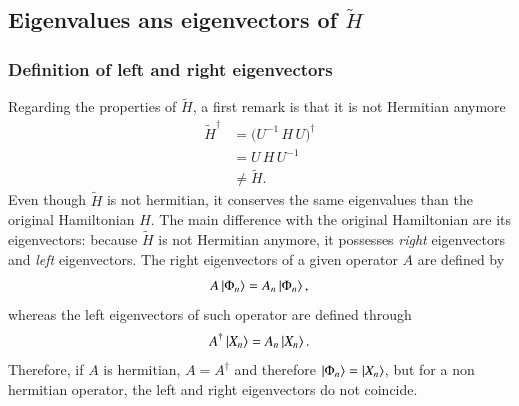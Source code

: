 \documentclass[aip,jcp,reprint,noshowkeys,superscriptaddress]{revtex4-1}
\begin{document}
\subsection{Eigenvalues ans eigenvectors of $\tilde{H}$}
\subsubsection{Definition of left and right eigenvectors}
Regarding the properties of $\tilde{H}$, a first remark is that it is not Hermitian anymore
\begin{equation}
 \begin{aligned}
 \tilde{H}^\dagger & = \bigg(  U^{-1} \, H \,U \bigg)^\dagger \\
                   & = U\, H \, U^{-1}  \\
                   & \ne \tilde{H}.
 \end{aligned}
\end{equation}
Even though $\tilde{H}$ is not hermitian, it conserves the same eigenvalues than the original Hamiltonian $H$. 
The main difference with the original Hamiltonian are its eigenvectors: because $\tilde{H}$ is not Hermitian anymore, it possesses \textit{right} eigenvectors and \textit{left} eigenvectors. 
The right eigenvectors of a given operator $A$ are defined by
\begin{equation}
 A \ket{\Phi_n} = A_n \ket{\Phi_n}, 
\end{equation}
whereas the left eigenvectors of such operator are defined through
\begin{equation}
 A^{\dagger} \ket{X_n} = A_n \ket{X_n}.
\end{equation}
Therefore, if $A$ is hermitian, $A = A^{\dagger}$ and therefore $\ket{\Phi_n} = \ket{X_n} $, but for a non hermitian operator, the left and right eigenvectors do not coincide.
\end{document}
